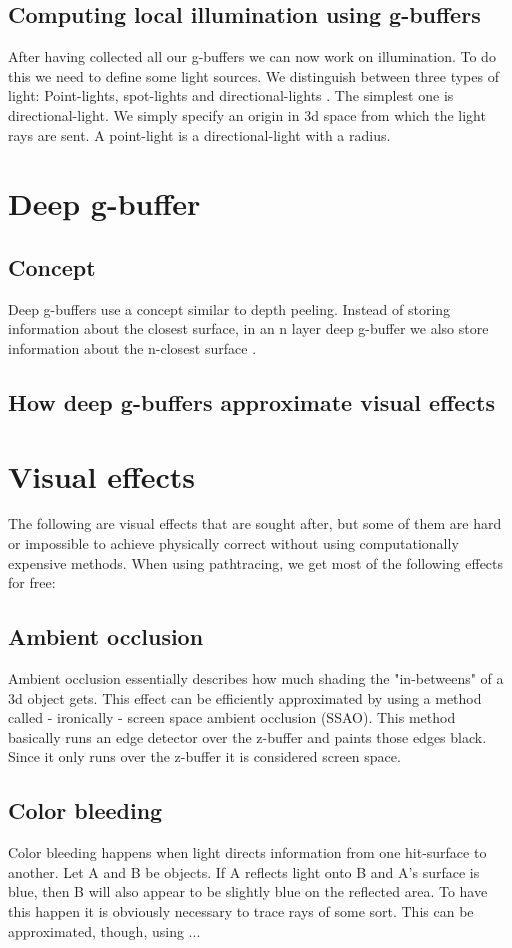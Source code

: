 \documentclass{ACGSeminar}
\begin{document}
	\subsection{Computing local illumination using g-buffers}
		After having collected all our g-buffers we can now work on illumination. To do this we need to define some light sources. We distinguish between three types of light:
		Point-lights, spot-lights and directional-lights \cite{DST}. The simplest one is directional-light. We simply specify an origin in 3d space from which the light rays are sent. A point-light is a directional-light with a radius. %

\section{Deep g-buffer}
	\subsection{Concept}
		Deep g-buffers use a concept similar to depth peeling. Instead of storing information about the closest surface, in an n layer deep g-buffer we also store information about the n-closest surface \cite{NDGB}.
	\subsection{How deep g-buffers approximate visual effects}

\section{Visual effects}
	The following are visual effects that are sought after, but some of them are hard or impossible to achieve physically correct without using
	computationally expensive methods. When using pathtracing, we get most of the following effects for free: 
	\subsection{Ambient occlusion}
		Ambient occlusion essentially describes how much shading the "in-betweens" of a 3d object gets. This effect can be efficiently approximated by using a method called - ironically - screen space ambient occlusion (SSAO). This method basically runs an edge detector over the z-buffer and paints those edges black. Since it only runs over the z-buffer it is considered screen space.
	\subsection{Color bleeding}
		Color bleeding happens when light directs information from one hit-surface to another. Let A and B be objects. If A reflects light onto B and A's surface is blue, then B will also appear
		to be slightly blue on the reflected area. To have this happen it is obviously necessary to trace rays of some sort. This can be approximated, though, using ... %
\end{document}
